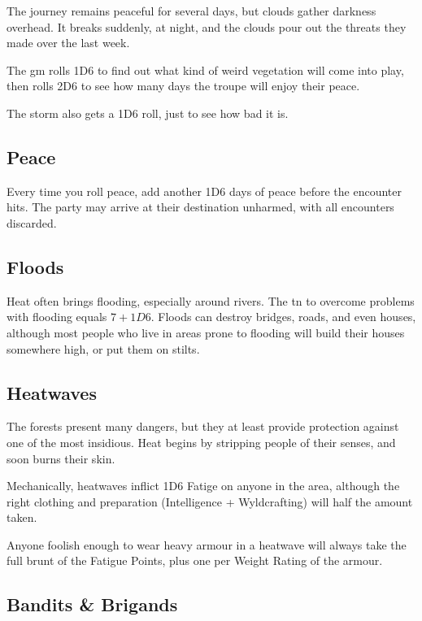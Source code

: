 \begin{multicols}{2}
\begin{exampletext}
  The journey remains peaceful for several days, but clouds gather darkness overhead.
  It breaks suddenly, at night, and the clouds pour out the threats they made over the last week.
\end{exampletext}

The \gls{gm} rolls 1D6 to find out what kind of weird vegetation will come into play, then rolls 2D6 to see how many days the troupe will enjoy their peace.

The storm also gets a 1D6 roll, just to see how bad it is.

\subsection{Peace}

Every time you roll peace, add another 1D6 days of peace before the encounter hits.
The party may arrive at their destination unharmed, with all encounters discarded.

\subsection{Floods}

Heat often brings flooding, especially around rivers.
The \gls{tn} to overcome problems with flooding equals $7 + 1D6$.
Floods can destroy bridges, roads, and even houses, although most people who live in areas prone to flooding will build their houses somewhere high, or put them on stilts.

\subsection{Heatwaves}

The forests present many dangers, but they at least provide protection against one of the most insidious.
Heat begins by stripping people of their senses, and soon burns their skin.

Mechanically, heatwaves inflict 1D6 Fatige on anyone in the area, although the right clothing and preparation (Intelligence + Wyldcrafting) will half the amount taken.

Anyone foolish enough to wear heavy armour in a heatwave will always take the full brunt of the Fatigue Points, plus one per Weight Rating of the armour.

\subsection{Bandits \& Brigands}


\end{multicols}

